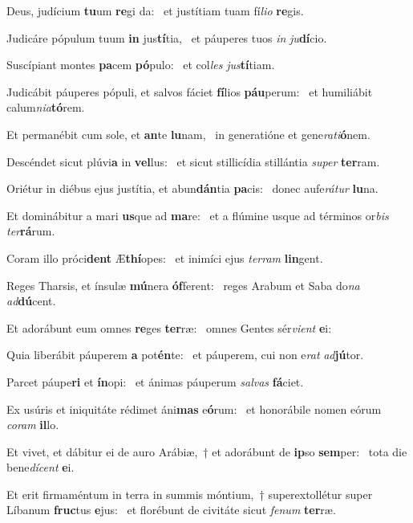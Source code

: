\item Deus, judícium \textbf{tu}um \textbf{re}gi da:~\psstar{} et justítiam tuam fí\textit{lio} \textbf{re}gis.
\item Judicáre pópulum tuum \textbf{in} jus\textbf{tí}tia,~\psstar{} et páuperes tuos \textit{in} \textit{ju}\textbf{dí}cio.
\item Suscípiant montes \textbf{pa}cem \textbf{pó}pulo:~\psstar{} et col\textit{les} \textit{jus}\textbf{tí}tiam.
\item Judicábit páuperes pópuli, et salvos fáciet \textbf{fí}lios \textbf{páu}perum:~\psstar{} et humiliábit calum\textit{nia}\textbf{tó}rem.
\item Et permanébit cum sole, et \textbf{an}te \textbf{lu}nam,~\psstar{} in generatióne et gene\textit{rati}\textbf{ó}nem.
\item Descéndet sicut plúvi\textbf{a} in \textbf{vel}lus:~\psstar{} et sicut stillicídia stillántia \textit{super} \textbf{ter}ram.
\item Oriétur in diébus ejus justítia, et abun\textbf{dán}tia \textbf{pa}cis:~\psstar{} donec aufe\textit{rátur} \textbf{lu}na.
\item Et dominábitur a mari \textbf{us}que ad \textbf{ma}re:~\psstar{} et a flúmine usque ad términos or\textit{bis} \textit{ter}\textbf{rá}rum.
\item Coram illo próci\textbf{dent} Æ\textbf{thí}opes:~\psstar{} et inimíci ejus \textit{terram} \textbf{lin}gent.
\item Reges Tharsis, et ínsulæ \textbf{mú}nera \textbf{óf}ferent:~\psstar{} reges Arabum et Saba do\textit{na} \textit{ad}\textbf{dú}cent.
\item Et adorábunt eum omnes \textbf{re}ges \textbf{ter}ræ:~\psstar{} omnes Gentes sér\textit{vient} \textbf{e}i:
\item Quia liberábit páuperem \textbf{a} pot\textbf{én}te:~\psstar{} et páuperem, cui non e\textit{rat} \textit{ad}\textbf{jú}tor.
\item Parcet páupe\textbf{ri} et \textbf{ín}opi:~\psstar{} et ánimas páuperum \textit{salvas} \textbf{fá}ciet.
\item Ex usúris et iniquitáte rédimet áni\textbf{mas} e\textbf{ó}rum:~\psstar{} et honorábile nomen eórum \textit{coram} \textbf{il}lo.
\item Et vivet, et dábitur ei de auro Arábiæ,~† et adorábunt de \textbf{ip}so \textbf{sem}per:~\psstar{} tota die bene\textit{dícent} \textbf{e}i.
\item Et erit firmaméntum in terra in summis móntium,~† superextollétur super Líbanum \textbf{fruc}tus \textbf{e}jus:~\psstar{} et florébunt de civitáte sicut \textit{fenum} \textbf{ter}ræ.
